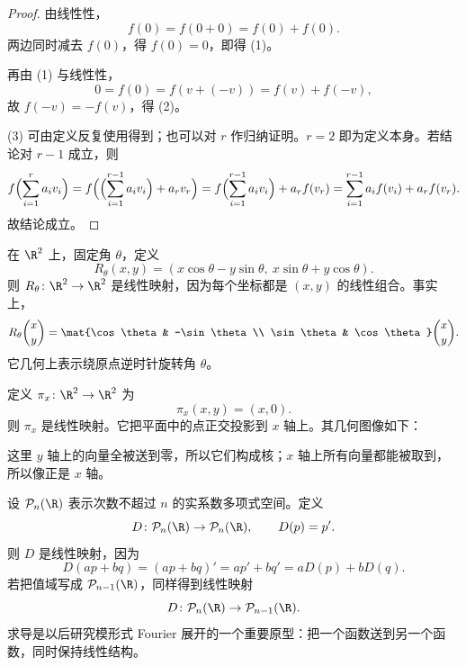 \begin{proof}
由线性性，
\[
  f(0)=f(0+0)=f(0)+f(0).
\]
两边同时减去 $f(0)$，得 $f(0)=0$，即得 (1)。

再由 (1) 与线性性，
\[
  0=f(0)=f(v+(-v))=f(v)+f(-v),
\]
故 $f(-v)=-f(v)$，得 (2)。

(3) 可由定义反复使用得到；也可以对 $r$ 作归纳证明。$r=2$ 即为定义本身。若结论对 $r-1$ 成立，则
\[
  f\Bigl(\sum_{i=1}^r a_i v_i\Bigr)
  =f\Bigl(\Bigl(\sum_{i=1}^{r-1} a_i v_i\Bigr)+a_r v_r\Bigr)
  =f\Bigl(\sum_{i=1}^{r-1} a_i v_i\Bigr)+a_r f(v_r)
  =\sum_{i=1}^{r-1} a_i f(v_i)+a_r f(v_r).
\]
故结论成立。
\end{proof}

\begin{example}[旋转]
在 $\R^2$ 上，固定角 $\theta$，定义
\[
  R_\theta(x,y)=(x\cos\theta-y\sin\theta,\ x\sin\theta+y\cos\theta).
\]
则 $R_\theta\colon \R^2\to\R^2$ 是线性映射，因为每个坐标都是 $(x,y)$ 的线性组合。事实上，
\[
  R_\theta\binom{x}{y}=
  \mat{\cos\theta & -\sin\theta\\ \sin\theta & \cos\theta}
  \binom{x}{y}.
\]
它几何上表示绕原点逆时针旋转角 $\theta$。
\end{example}

\begin{example}[投影]
定义 $\pi_x\colon \R^2\to\R^2$ 为
\[
  \pi_x(x,y)=(x,0).
\]
则 $\pi_x$ 是线性映射。它把平面中的点正交投影到 $x$ 轴上。其几何图像如下：
\begin{center}
\end{center}
这里 $y$ 轴上的向量全被送到零，所以它们构成核；$x$ 轴上所有向量都能被取到，所以像正是 $x$ 轴。
\end{example}

\begin{example}[多项式上的求导]
设 $\mathcal P_n(\R)$ 表示次数不超过 $n$ 的实系数多项式空间。定义
\[
  D\colon \mathcal P_n(\R)\to \mathcal P_n(\R),\qquad D(p)=p'.
\]
则 $D$ 是线性映射，因为
\[
  D(ap+bq)=(ap+bq)'=ap'+bq'=aD(p)+bD(q).
\]
若把值域写成 $\mathcal P_{n-1}(\R)$，同样得到线性映射
\[
  D\colon \mathcal P_n(\R)\to \mathcal P_{n-1}(\R).
\]
求导是以后研究模形式 Fourier 展开的一个重要原型：把一个函数送到另一个函数，同时保持线性结构。
\end{example}

